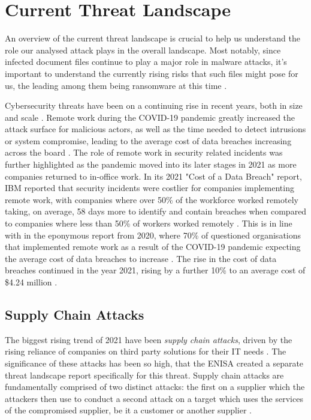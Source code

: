 \section{Current Threat Landscape}
An overview of the current threat landscape is crucial to help us understand the role our analysed
attack plays in the overall landscape. Most notably, since infected document files continue to play 
a major role in malware attacks, it's important to understand the currently rising risks that such
files might pose for us, the leading among them being ransomware at this time \cite{enisa_threat_landscape}.

Cybersecurity threats have been on a continuing rise in recent years, both in size and scale 
\cite{enisa_threat_landscape}. Remote work during the COVID-19 pandemic greatly increased
the attack surface for malicious actors, as well as the time needed to detect intrusions 
or system compromise, leading to the average cost of data breaches increasing across the
board \cite{ibm_2020_cost_of_a_data_breach}. The role of remote work in security related 
incidents was further highlighted as the pandemic moved into its later stages in 2021 as
more companies returned to in-office work. In its 2021 "Cost of a Data Breach" report,
IBM reported that security incidents were costlier for companies implementing remote work,
with companies where over 50\% of the workforce worked remotely taking, on average, 58 days
more to identify and contain breaches when compared to companies where less than 50\% of workers
worked remotely \cite{ibm_2021_cost_of_a_data_breach}. This is in line with in the eponymous 
report from 2020, where 70\% of questioned organisations that implemented remote work as a result of the 
COVID-19 pandemic expecting the average cost of data breaches to increase \cite{ibm_2020_cost_of_a_data_breach}. 
The rise in the cost of data breaches continued in the year 2021, rising by a further 10\% to an 
average cost of \$4.24 million \cite{ibm_2021_cost_of_a_data_breach}.

\subsection{Supply Chain Attacks} \label{sec:supply-chain-attacks}
The biggest rising trend of 2021 have been \emph{supply chain attacks}, driven by the rising reliance of 
companies on third party solutions for their IT needs \cite{enisa_threat_landscape, morphisec_threat_landscape}.
The significance of these attacks has been so high, that the \acrfull{ENISA} created a separate threat
landscape report specifically for this threat.
Supply chain attacks are fundamentally comprised of two distinct attacks: the first on a supplier which the 
attackers then use to conduct a second attack on a target which uses the services of the compromised supplier,
be it a customer or another supplier \cite{enisa_supply_chain_threat_landscape}.

